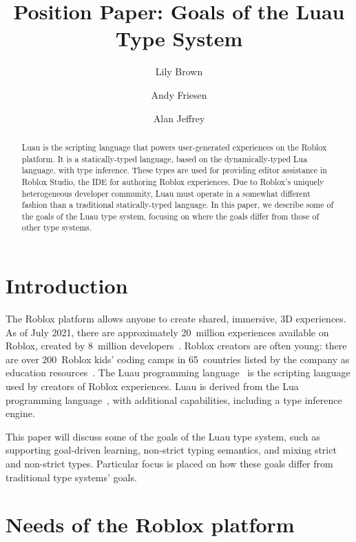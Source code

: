 \documentclass[acmsmall]{acmart}
\begin{document}
\title{Position Paper: Goals of the Luau Type System}

\author{Lily Brown}
\author{Andy Friesen}
\author{Alan Jeffrey}

\begin{abstract}
  Luau is the scripting language that powers user-generated experiences on the
  Roblox platform. It is a statically-typed language, based on the
  dynamically-typed Lua language, with type inference. These types are used for providing
  editor assistance in Roblox Studio, the IDE for authoring Roblox experiences.
  Due to Roblox's uniquely heterogeneous developer community, Luau must operate
  in a somewhat different fashion than a traditional statically-typed language.
  In this paper, we describe some of the goals of the Luau type system,
  focusing on where the goals differ from those of other type systems.
\end{abstract}

\maketitle

\section{Introduction}

The Roblox platform allows anyone to create shared,
immersive, 3D experiences.  As of July 2021, there are
approximately 20~million experiences available on Roblox, created
by 8~million developers~\cite{Roblox}.  Roblox creators are often young: there are
over 200~Roblox kids' coding camps in 65~countries
listed by the company as education resources~\cite{AllEducators}.
The Luau programming language~\cite{Luau} is the scripting language
used by creators of Roblox experiences. Luau is derived from the Lua
programming language~\cite{Lua}, with additional capabilities,
including a type inference engine.

This paper will discuss some of the goals of the Luau type system, such
as supporting goal-driven learning, non-strict typing semantics, and
mixing strict and non-strict types.  Particular focus is placed on how
these goals differ from traditional type systems' goals.

\section{Needs of the Roblox platform}
\end{document}

